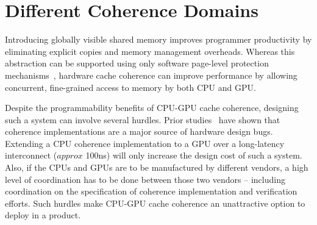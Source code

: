\section{Different Coherence Domains}
Introducing globally visible shared memory improves programmer productivity by
eliminating explicit copies and memory management overheads. Whereas this
abstraction can be supported using only software page-level protection
mechanisms~\cite{UVM, HSA}, hardware cache coherence can improve performance by
allowing concurrent, fine-grained access to memory by both CPU and GPU.


Despite the programmability benefits of CPU-GPU cache coherence, designing such
a system can involve several hurdles. Prior studies~\cite{Hong2012} have shown
that coherence implementations are a major source of hardware design bugs.
Extending a CPU coherence implementation to a GPU over a long-latency
interconnect ($approx$ 100ns)  will only increase the design cost of such a system.
Also, if the CPUs and GPUs are to be manufactured by different vendors, a high
level of coordination has to be done between those two vendors -- including
coordination on the specification of coherence implementation and verification
efforts. Such hurdles make CPU-GPU cache coherence an unattractive option to
deploy in a product.

